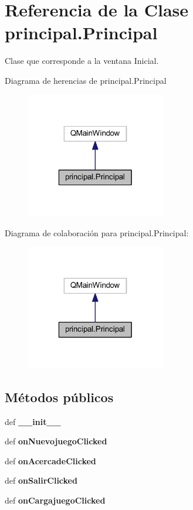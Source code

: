 \section{Referencia de la Clase principal.\-Principal}
\label{classprincipal_1_1_principal}


Clase que corresponde a la ventana Inicial.  




Diagrama de herencias de principal.\-Principal\nopagebreak
\begin{figure}[H]
\begin{center}
\leavevmode
\includegraphics[width=172pt]{classprincipal_1_1_principal__inherit__graph}
\end{center}
\end{figure}


Diagrama de colaboración para principal.\-Principal\-:\nopagebreak
\begin{figure}[H]
\begin{center}
\leavevmode
\includegraphics[width=172pt]{classprincipal_1_1_principal__coll__graph}
\end{center}
\end{figure}
\subsection*{Métodos públicos}
\begin{DoxyCompactItemize}
\item 
def {\bf \-\_\-\-\_\-init\-\_\-\-\_\-}
\item 
def {\bf on\-Nuevojuego\-Clicked}
\item 
def {\bf on\-Acercade\-Clicked}
\item 
def {\bf on\-Salir\-Clicked}
\item 
def {\bf on\-Cargajuego\-Clicked}
\end{DoxyCompactItemize}
